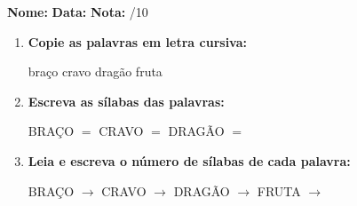 \begin{exercicio}



\noindent\textbf{Nome:} \underline{\hspace{3.2cm}} \quad \textbf{Data:} \underline{\hspace{1.6cm}} \quad \textbf{Nota:} \underline{\hspace{0.9cm}}/10


\begin{enumerate}

  \item \textbf{Copie as palavras em letra cursiva:}
  \begin{center}
  braço \quad cravo \quad dragão \quad fruta
  \end{center}
  \begin{center}
  \underline{\hspace{2.4cm}} \quad \underline{\hspace{2.4cm}} \quad \underline{\hspace{2.4cm}} \quad \underline{\hspace{2.4cm}}
  \end{center}

  \item \textbf{Escreva as sílabas das palavras:}
  \begin{center}
  BRAÇO $=$ \underline{\hspace{1.5cm}} \underline{\hspace{1.5cm}} \quad CRAVO $=$ \underline{\hspace{1.5cm}} \underline{\hspace{1.5cm}} \quad DRAGÃO $=$ \underline{\hspace{1.5cm}} \underline{\hspace{1.5cm}}
  \end{center}

  \item \textbf{Leia e escreva o número de sílabas de cada palavra:}
  \begin{center}
  BRAÇO $\rightarrow$ \underline{\hspace{0.9cm}} \quad CRAVO $\rightarrow$ \underline{\hspace{0.9cm}} \quad DRAGÃO $\rightarrow$ \underline{\hspace{0.9cm}} \quad FRUTA $\rightarrow$ \underline{\hspace{0.9cm}}
  \end{center}


\end{enumerate}
\end{exercicio}
